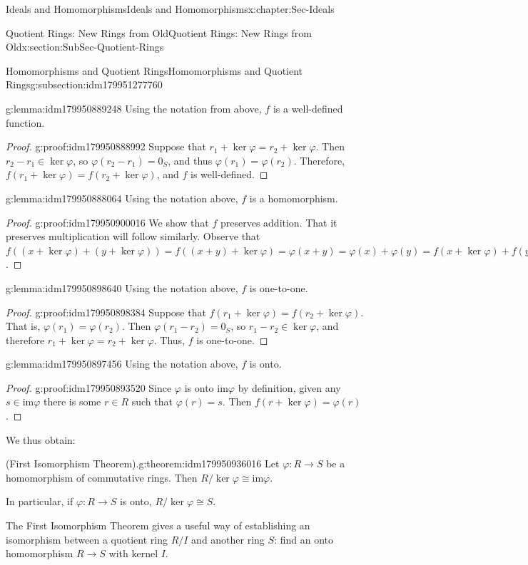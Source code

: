 \documentclass[oneside,10pt,]{book}
\numberwithin{equation}{section}
\def\p{\varphi}
\def\im{\text{im}}
\begin{document}
\begin{chapterptx}{Ideals and Homomorphisms}{}{Ideals and Homomorphisms}{}{}{x:chapter:Sec-Ideals}
\begin{sectionptx}{Quotient Rings: New Rings from Old}{}{Quotient Rings: New Rings from Old}{}{}{x:section:SubSec-Quotient-Rings}
\begin{subsectionptx}{Homomorphisms and Quotient Rings}{}{Homomorphisms and Quotient Rings}{}{}{g:subsection:idm179951277760}
\begin{lemma}{}{}{g:lemma:idm179950889248}%
Using the notation from above, \(f\) is a well-defined function.%
\end{lemma}
\begin{proof}{}{g:proof:idm179950888992}
Suppose that \(r_1 + \ker\p = r_2 + \ker\p\). Then \(r_2-r_1 \in \ker\p\), so \(\p(r_2-r_1) = 0_S\), and thus \(\p(r_1) = \p(r_2)\). Therefore, \(f(r_1+\ker\p) = f(r_2+\ker\p)\), and \(f\) is well-defined.%
\end{proof}
\begin{lemma}{}{}{g:lemma:idm179950888064}%
Using the notation above, \(f\) is a homomorphism.%
\end{lemma}
\begin{proof}{}{g:proof:idm179950900016}
We show that \(f\) preserves addition. That it preserves multiplication will follow similarly. Observe that \(f((x+\ker\p) + (y+\ker\p)) = f((x+y)+\ker\p) = \p(x+y) = \p(x)+\p(y) = f(x+\ker\p) + f(y+\ker\p)\).%
\end{proof}
\begin{lemma}{}{}{g:lemma:idm179950898640}%
Using the notation above, \(f\) is one-to-one.%
\end{lemma}
\begin{proof}{}{g:proof:idm179950898384}
Suppose that \(f(r_1 + \ker\p) = f(r_2 + \ker\p)\). That is, \(\p(r_1) = \p(r_2)\). Then \(\p(r_1 - r_2) = 0_S\), so \(r_1 -r_2 \in \ker\p\), and therefore \(r_1 + \ker\p = r_2 + \ker \p\). Thus, \(f\) is one-to-one.%
\end{proof}
\begin{lemma}{}{}{g:lemma:idm179950897456}%
Using the notation above, \(f\) is onto.%
\end{lemma}
\begin{proof}{}{g:proof:idm179950893520}
Since \(\p\) is onto \(\im \p\) by definition, given any \(s\in \im \p\) there is some \(r\in R\) such that \(\p(r) = s\). Then \(f(r+\ker\p) = \p(r)\).%
\end{proof}
We thus obtain:%
\begin{theorem}{(First Isomorphism Theorem).}{}{g:theorem:idm179950936016}%
%
Let \(\p : R\to S\) be a homomorphism of commutative rings. Then \(R/\ker \p \cong \im \p\).%
\par
In particular, if \(\p : R\to S\) is onto, \(R/\ker \p \cong S\).%
\end{theorem}
The First Isomorphism Theorem gives a useful way of establishing an isomorphism between a quotient ring \(R/I\) and another ring \(S\): find an onto homomorphism \(R\to S\) with kernel \(I\).%

\end{subsectionptx}
\end{sectionptx}
\end{chapterptx}
\end{document}
